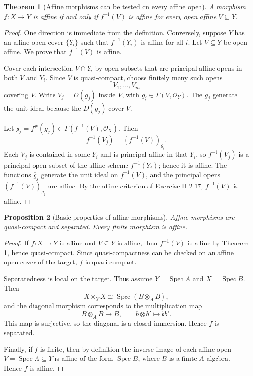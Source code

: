 \documentclass[11pt]{amsart}
\DeclareMathOperator{\Spec}{Spec}
\newcommand{\OO}{\mathcal O}
\theoremstyle{plain}
\newtheorem{theorem}{Theorem}[section]
\newtheorem{proposition}[theorem]{Proposition}
\theoremstyle{definition}
\theoremstyle{remark}
\begin{document}
\begin{theorem}[Affine morphisms can be tested on every affine open]\label{thm:affine-test}
A morphism $f:X\to Y$ is affine if and only if $f^{-1}(V)$ is affine for every open affine $V\subseteq Y$.
\end{theorem}

\begin{proof}
One direction is immediate from the definition.  Conversely, suppose $Y$ has an affine open cover $\{Y_i\}$ such that $f^{-1}(Y_i)$ is affine for all $i$.  Let $V\subseteq Y$ be open affine.  We prove that $f^{-1}(V)$ is affine.

Cover each intersection $V\cap Y_i$ by open subsets that are principal affine opens in both $V$ and $Y_i$.  Since $V$ is quasi-compact, choose finitely many such opens
\[
  V_{1},\ldots,V_m
\]
covering $V$.  Write $V_j=D(g_j)$ inside $V$, with $g_j\in \Gamma(V,\OO_Y)$.  The $g_j$ generate the unit ideal because the $D(g_j)$ cover $V$.

Let $\overline g_j=f^\#(g_j)\in \Gamma(f^{-1}(V),\OO_X)$.  Then
\[
  f^{-1}(V_j) = (f^{-1}(V))_{\overline g_j}.
\]
Each $V_j$ is contained in some $Y_i$ and is principal affine in that $Y_i$, so $f^{-1}(V_j)$ is a principal open subset of the affine scheme $f^{-1}(Y_i)$; hence it is affine.  The functions $\overline g_j$ generate the unit ideal on $f^{-1}(V)$, and the principal opens $(f^{-1}(V))_{\overline g_j}$ are affine.  By the affine criterion of Exercise II.2.17, $f^{-1}(V)$ is affine.
\end{proof}

\begin{proposition}[Basic properties of affine morphisms]\label{prop:affine-basic-properties}
Affine morphisms are quasi-compact and separated.  Every finite morphism is affine.
\end{proposition}

\begin{proof}
If $f:X\to Y$ is affine and $V\subseteq Y$ is affine, then $f^{-1}(V)$ is affine by Theorem \ref{thm:affine-test}, hence quasi-compact.  Since quasi-compactness can be checked on an affine open cover of the target, $f$ is quasi-compact.

Separatedness is local on the target.  Thus assume $Y=\Spec A$ and $X=\Spec B$.  Then
\[
  X\times_Y X \cong \Spec(B\otimes_A B),
\]
and the diagonal morphism corresponds to the multiplication map
\[
  B\otimes_A B \longrightarrow B,
  \qquad b\otimes b'\longmapsto bb'.
\]
This map is surjective, so the diagonal is a closed immersion.  Hence $f$ is separated.

Finally, if $f$ is finite, then by definition the inverse image of each affine open $V=\Spec A\subseteq Y$ is affine of the form $\Spec B$, where $B$ is a finite $A$-algebra.  Hence $f$ is affine.
\end{proof}
\end{document}
